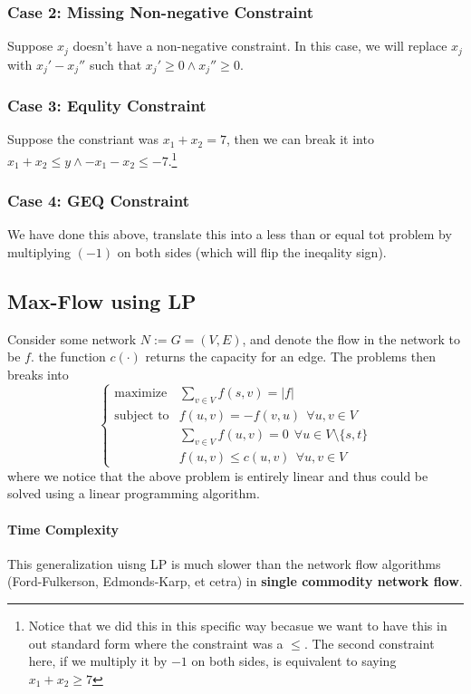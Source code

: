 \documentclass[10pt]{article}
\begin{document}
\subsubsection{Case 2: Missing Non-negative Constraint} Suppose $x_j$ doesn't have a non-negative constraint. In this case, we will replace $x_j$ with $x_j' - x_j''$ such that $x_j' \geq 0\land x_j'' \geq 0$. 
\subsubsection{Case 3: Equlity Constraint} Suppose the constriant was $x_1 + x_2 = 7$, then we can break it into $x_1 + x_2 \leq y \land -x_1 - x_2 \leq -7$.\footnote{Notice that we did this in this specific way becasue we want to have this in out standard form where the constraint was a $\leq$. The second constraint here, if we multiply it by $-1$ on both sides, is equivalent to saying $x_1+x_2 \geq 7$}
\subsubsection{Case 4: GEQ Constraint} We have done this above, translate this into a less than or equal tot problem by multiplying $(-1)$ on both sides (which will flip the ineqality sign).

\subsection{Max-Flow using LP}
Consider some network $N:= G = (V,E)$, and denote the flow in the network to be $f$. the function $c(\cdot)$ returns the capacity for an edge. The problems then breaks into
$$
\begin{cases}
    \text{maximize} &\sum_{v\in V} f(s,v) = |f| \\
    \text{subject to} &f(u,v) = -f(v,u)~~\forall u, v \in V \\
    &\sum_{v\in V}f(u,v) = 0 ~~\forall u \in V\setminus\{s, t\} \\
    &f(u,v) \leq c(u,v) ~~\forall u,v \in V
\end{cases}
$$
where we notice that the above problem is entirely linear and thus could be solved using a linear programming algorithm.

\paragraph{Time Complexity} This generalization uisng LP is much slower than the network flow algorithms (Ford-Fulkerson, Edmonds-Karp, et cetra) in \textbf{single commodity network flow}. 
\end{document}
